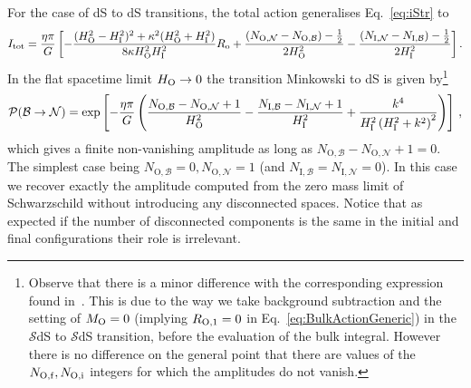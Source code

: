 \documentclass[11pt,a4paper]{article}
\newcommand{\be}{\begin{equation}}
\newcommand{\ee}{\end{equation}}
\begin{document}
For the case of dS to dS transitions, the total action generalises Eq.~\eqref{eq:iStr} to
\begin{equation} 
\small{I_{\rm tot} = \frac{\eta \pi}{G} \left[-\frac{(H_{\rm O}^{2} -H_{\rm I}^{2})^{2} + \kappa^{2}(H_{\rm O}^{2} + H_{\rm I}^{2})}{8 \kappa H_{\rm O}^2 H_{\rm I}^2} R_{\rm o} + \frac{(N_{\text{O}, \mathcal{N}} - N_{\text{O}, \mathcal{B}}) - \frac{1}{2}}{2 H_{\rm O}^{2}} - \frac{(N_{\text{I}, \mathcal{N}} - N_{\text{I}, \mathcal{B}}) - \frac{1}{2}}{2 H_{\rm I}^{2}}\right]} \,.
\end{equation} 
In the flat spacetime limit $H_{\rm O} \rightarrow 0$ the transition Minkowski to dS is given by\footnote{Observe that there is a minor difference with the corresponding expression found in~\cite{Bachlechner:2016mtp}. This is due to the way we take background subtraction and the setting of $M_{\rm O}=0$ (implying $R_{\rm{O},1} = 0$ in Eq.~\eqref{eq:BulkActionGeneric}) in the $\mathcal{S}$dS to $\mathcal{S}$dS transition, before the evaluation of the bulk integral. However there is no difference on the general point that there are values of the $N_{\rm{O}, f}, N_{\rm{O},i}$ integers for which the amplitudes do not vanish.}
\be
\mathcal{P}(\mathcal{B} \rightarrow \mathcal{N}) = \exp\left[-\frac{\eta \pi}{G}\left(\frac{N_{\text{O}, \mathcal{B}} - N_{\text{O}, \mathcal{N}} +1 }{H_{\rm O}^2} - \frac{N_{\text{I}, \mathcal{B}} - N_{\text{I}, \mathcal{N}} + 1}{H_{\rm I}^2} + \frac{k^4}{H_{\rm I}^2\left(H_{\rm I}^2 + k^2\right)^2}\right)\right] \,,\label{disconnected}
\ee
which gives a finite non-vanishing amplitude as long as $N_{\text{O}, \mathcal{B}} - N_{\text{O}, \mathcal{N}} + 1 = 0$. The simplest case being $N_{\text{O}, \mathcal{B}} = 0, N_{\text{O}, \mathcal{N}} = 1$ (and $N_{\text{I}, \mathcal{B}} = N_{\text{I}, \mathcal{N}} = 0$). In this case we recover exactly the amplitude computed from the zero mass limit of Schwarzschild without introducing any disconnected spaces. Notice that as expected if the number of disconnected components is the same in the initial and final configurations their role is irrelevant.
\end{document}
